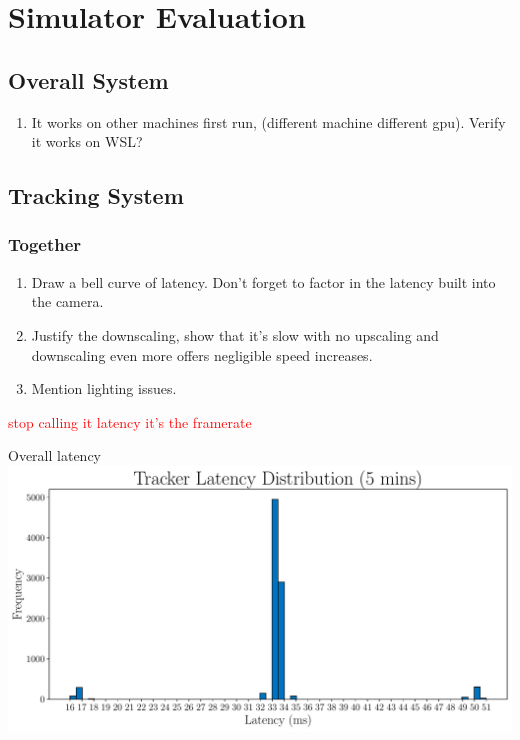 \section{Simulator Evaluation}

\subsection{Overall System}
\begin{enumerate}
	\item It works on other machines first run, (different machine different gpu). Verify it works on WSL?
\end{enumerate}

\subsection{Tracking System}
\subsubsection{Together}
\begin{enumerate}
	\item Draw a bell curve of latency. Don't forget to factor in the latency built into the camera. 
	\item Justify the downscaling, show that it's slow with no upscaling and downscaling even more offers negligible speed increases.  
	\item Mention lighting issues.
\end{enumerate}

\textcolor{red}{stop calling it latency it's the framerate}

\begin{figureBox}[label={fig:overall-latency}, width=1.0\linewidth]{Overall latency}
	\includegraphics[width = 1.0\linewidth]{./evaluation/figures/overall-latency.pdf}
\end{figureBox}

